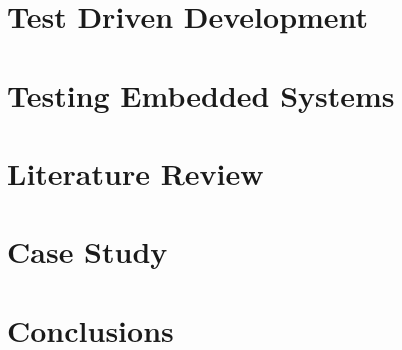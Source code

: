 \documentclass[11pt,oneside]{book}
\theoremstyle{definition}
\begin{document}
    \chapter{Test Driven Development}
    

    \chapter{Testing Embedded Systems}
    

    \chapter{Literature Review}
    

    \chapter{Case Study}
    

    \chapter{Conclusions}
    

    \nocite{*}
    \printbibliography[title={Bibliography}] 

    \begin{appendices}
        
    \end{appendices}
\end{document}
